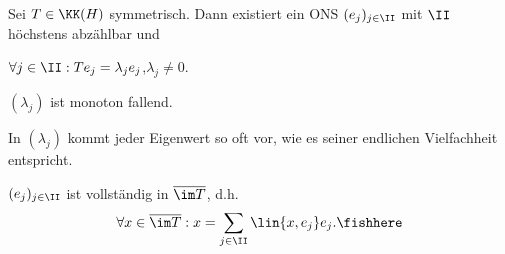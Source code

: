 \begin{prop}
Sei $T\in \KK(H)$ symmetrisch. Dann existiert ein ONS $(e_j)_{j\in\II}$ mit
$\II$ höchstens abzählbar und
\begin{defnenum}
\item $\forall j\in\II : T e_j = \lambda_j e_j$,\quad $\lambda_j\neq 0$.
\item $(\lambda_j)$ ist monoton fallend.
\item In $(\lambda_j)$ kommt jeder Eigenwert so oft vor, wie es seiner
endlichen Vielfachheit entspricht.
\item $(e_j)_{j\in\II}$ ist vollständig in $\overline{\im T}$, d.h.
\begin{align*}
\forall x\in \overline{\im T} : x = \sum_{j\in\II} \lin{x,e_j}e_j.\fishhere
\end{align*}
\end{defnenum}
\end{prop}